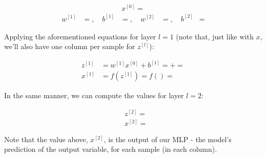\documentclass[12pt]{article}
\begin{document}
\begin{enumerate}[leftmargin=\labelsep]
\begin{enumerate}
                \begin{equation*}
                  \begin{aligned}
                    x^{[0]} = 
                  \end{aligned}
                \end{equation*}
                \begin{equation*}
                  \begin{aligned}
                    w^{[1]} & = , \quad
                    b^{[1]} & = , \quad
                    w^{[2]} & = , \quad
                    b^{[2]} & = 
                  \end{aligned}
                \end{equation*}

                Applying the aforementioned equations for layer $l = 1$ (note that, just like with $x$,
                we'll also have one column per sample for $z^{[l]}$):

                \begin{equation*}
                  \begin{aligned}
                    z^{[1]} & = w^{[1]}x^{[0]} + b^{[1]}
                    =   + 
                    =       \\
                    x^{[1]} & = f(z^{[1]})
                    = f\left(\right)
                    = 
                  \end{aligned}
                \end{equation*}

                In the same manner, we can compute the values for layer $l = 2$:

                \begin{equation*}
                  \begin{aligned}
                     & z^{[2]} =  \\
                     & x^{[2]} = 
                  \end{aligned}
                \end{equation*}

                Note that the value above, $x^{[2]}$, is the output of our MLP - the model's
                prediction of the output variable, for each sample (in each column).


\end{enumerate}
\end{enumerate}
\end{document}
